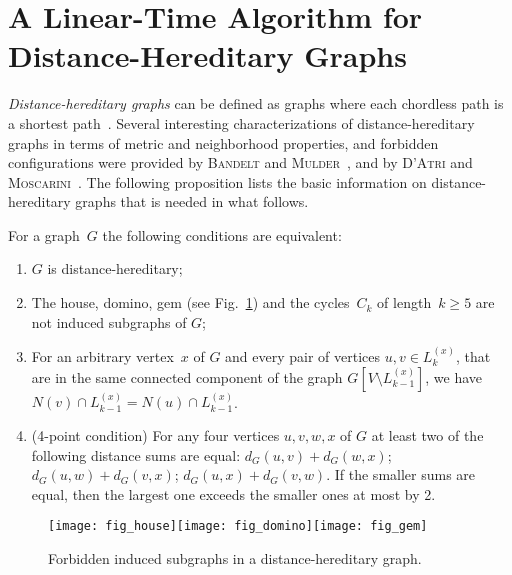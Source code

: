 \documentclass[10pt]{llncs}
\begin{document}
\section{A Linear-Time Algorithm for Distance-Hereditary Graphs}
    \label{sec:DistHered}

\emph{Distance-hereditary graphs} can be defined as graphs where each chordless path is a shortest path~\cite{howorka}. 
Several interesting characterizations of distance-hereditary graphs in terms of metric and neighborhood properties, and forbidden configurations were provided by \textsc{Bandelt} and \textsc{Mulder}~\cite{BM-dhg}, and by \textsc{D'Atri} and \textsc{Moscarini}~\cite{D-AM-dhg}. 
The following proposition  lists  the basic information on distance-hereditary graphs that is needed in what follows. 

\begin{proposition}
    \label{prop:dhg} 
For a graph~$G$ the following conditions are equivalent:
\begin{enumerate}[(1)]
    \item
        $G$ is distance-hereditary;
    \item
        The house, domino, gem (see Fig.~\ref{fig:dhg}) and the cycles~$C_k$ of length~$k \geq 5$ are not induced subgraphs of $G$;
    \item
        For an arbitrary vertex~$x$ of $G$ and every pair of vertices $u, v \in L_k^{(x)}$, that are in the same connected component of the graph $G[V \setminus L_{k-1}^{(x)}]$, we have $N(v) \cap L_{k-1}^{(x)} = N(u) \cap L_{k-1}^{(x)}$.
    \item
        (4-point condition)
        For any four vertices $u, v, w, x$ of $G$ at least two of the following distance sums are equal:
        $d_G(u, v) + d_G(w, x)$; $d_G(u, w) + d_G(v, x)$; $d_G(u, x) + d_G(v, w)$.
        If the smaller sums are equal, then the largest one exceeds the smaller ones at most by 2.
\end{enumerate}
\end{proposition}

\begin{figure}
    [htb]
    \centering
    \texttt{[image: fig\_house]}\hspace*{1cm}\texttt{[image: fig\_domino]}\hspace*{1cm}\texttt{[image: fig\_gem]}\caption
    {
        Forbidden induced subgraphs in a distance-hereditary graph. 
    }
    \label{fig:dhg} \end{figure}
\end{document}
